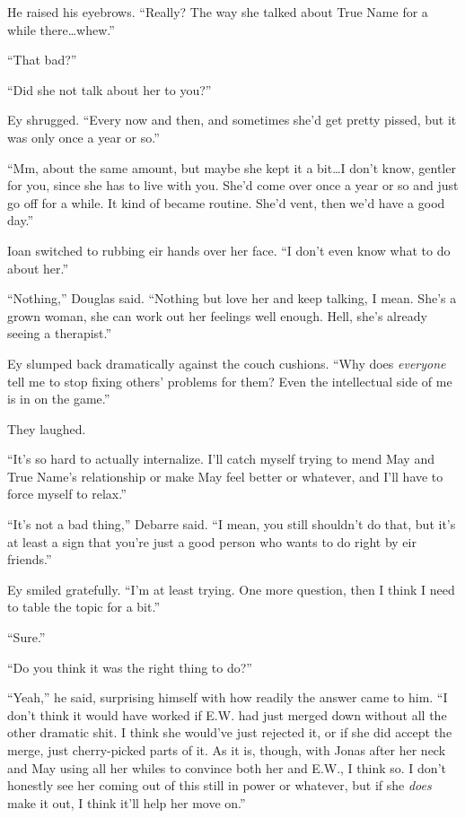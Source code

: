 He raised his eyebrows. ``Really? The way she talked about True Name for a while there\ldots whew.''

``That bad?''

``Did she not talk about her to you?''

Ey shrugged. ``Every now and then, and sometimes she'd get pretty pissed, but it was only once a year or so.''

``Mm, about the same amount, but maybe she kept it a bit\ldots I don't know, gentler for you, since she has to live with you. She'd come over once a year or so and just go off for a while. It kind of became routine. She'd vent, then we'd have a good day.''

Ioan switched to rubbing eir hands over her face. ``I don't even know what to do about her.''

``Nothing,'' Douglas said. ``Nothing but love her and keep talking, I mean. She's a grown woman, she can work out her feelings well enough. Hell, she's already seeing a therapist.''

Ey slumped back dramatically against the couch cushions. ``Why does \emph{everyone} tell me to stop fixing others' problems for them? Even the intellectual side of me is in on the game.''

They laughed.

``It's so hard to actually internalize. I'll catch myself trying to mend May and True Name's relationship or make May feel better or whatever, and I'll have to force myself to relax.''

``It's not a bad thing,'' Debarre said. ``I mean, you still shouldn't do that, but it's at least a sign that you're just a good person who wants to do right by eir friends.''

Ey smiled gratefully. ``I'm at least trying. One more question, then I think I need to table the topic for a bit.''

``Sure.''

``Do you think it was the right thing to do?''

``Yeah,'' he said, surprising himself with how readily the answer came to him. ``I don't think it would have worked if E.W. had just merged down without all the other dramatic shit. I think she would've just rejected it, or if she did accept the merge, just cherry-picked parts of it. As it is, though, with Jonas after her neck and May using all her whiles to convince both her and E.W., I think so. I don't honestly see her coming out of this still in power or whatever, but if she \emph{does} make it out, I think it'll help her move on.''

